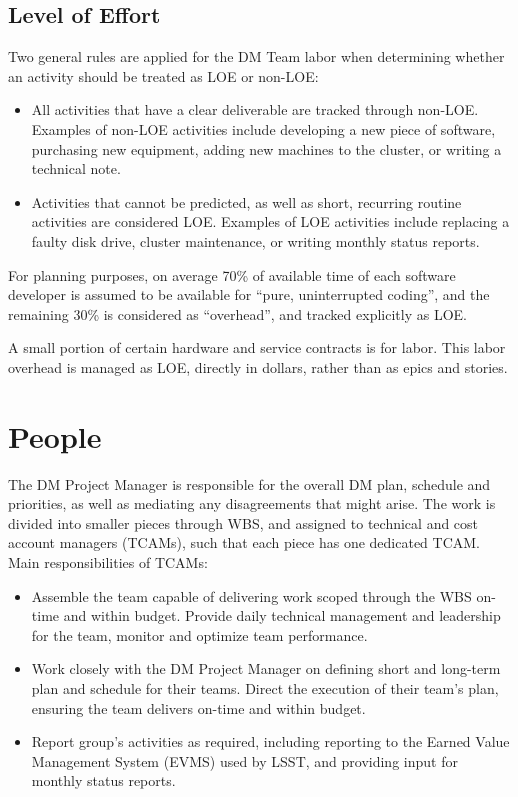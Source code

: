\documentclass[DM,toc,obsolete]{lsstdoc}
\begin{document}
\subsection{Level of Effort}
\label{\detokenize{index:level-of-effort}}
Two general rules are applied for the DM Team labor when determining whether an activity should be
treated as LOE or non-LOE:
\begin{itemize}
\item {}
All activities that have a clear deliverable are tracked through non-LOE. Examples of non-LOE
activities include developing a new piece of software, purchasing new equipment, adding new
machines to the cluster, or writing a technical note.

\item {}
Activities that cannot be predicted, as well as short, recurring routine activities are considered LOE.
Examples of LOE activities include replacing a faulty disk drive, cluster maintenance, or writing monthly
status reports.

\end{itemize}

For planning purposes, on average 70\% of available time of each software developer is assumed to be
available for ``pure, uninterrupted coding'', and the remaining 30\% is considered as ``overhead'', and tracked
explicitly as LOE.

A small portion of certain hardware and service contracts is for labor. This labor overhead is managed
as LOE, directly in dollars, rather than as epics and stories.


\section{People}
\label{\detokenize{index:people}}
The DM Project Manager is responsible for the overall DM plan, schedule and priorities, as well as
mediating any disagreements that might arise. The work is
divided into smaller pieces through WBS, and assigned to technical and cost account managers (TCAMs),
such that each piece has one dedicated TCAM. Main responsibilities of TCAMs:
\begin{itemize}
\item {}
Assemble the team capable of delivering work scoped through the WBS on-time and within budget.
Provide daily technical management and leadership for the team, monitor and optimize team performance.

\item {}
Work closely with the DM Project Manager on defining short and long-term plan and schedule for
their teams. Direct the execution of their team's plan, ensuring the team delivers on-time and within budget.

\item {}
Report group's activities as required, including reporting to the Earned Value Management System (EVMS)
used by LSST, and providing input for monthly status reports.

\end{itemize}
\end{document}
